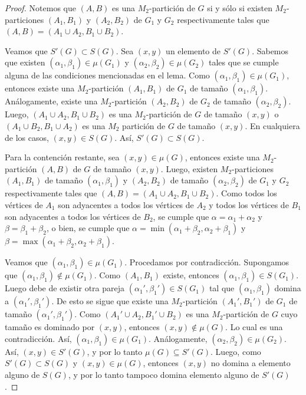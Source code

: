 \begin{proof}
Notemos que $(A,B)$ es una $M_2$-partición de $G$ si y sólo si existen $M_2$-particiones $(A_1,B_1)$ y $(A_2,B_2)$ de $G_1$ y $G_2$ respectivamente tales que $(A,B)=(A_1\cup A_2, B_1 \cup B_2)$.

Veamos que $S'(G)\subset S(G)$. Sea $(x,y)$ un elemento de $S'(G)$. Sabemos que existen $(\alpha_1,\beta_1)\in \mu(G_1)$ y $(\alpha_2,\beta_2)\in \mu(G_2)$ tales que se cumple alguna de las condiciones mencionadas en el lema. Como $(\alpha_1,\beta_1)\in \mu(G_1)$, entonces existe una $M_2$-partición $(A_1,B_1)$ de $G_1$ de tamaño $(\alpha_1, \beta_1)$. Análogamente, existe una $M_2$-partición $(A_2,B_2)$ de $G_2$ de tamaño $(\alpha_2, \beta_2)$. Luego, $(A_1\cup A_2, B_1 \cup B_2)$ es una $M_2$-partición de $G$ de tamaño $(x,y)$ o $(A_1\cup B_2, B_1 \cup A_2)$ es una $M_2$ partición de $G$ de tamaño $(x,y)$. En cualquiera de los casos, $(x,y)\in S(G)$. Así, $S'(G)\subset S(G)$.

Para la contención restante, sea $(x,y)\in\mu(G)$, entonces existe una $M_2$-partición $(A,B)$ de $G$ de tamaño $(x,y)$. Luego, existen $M_2$-particiones $(A_1,B_1)$ de tamaño $(\alpha_1, \beta_1)$ y $(A_2,B_2)$ de tamaño $(\alpha_2, \beta_2)$ de $G_1$ y $G_2$ respectivamente tales que $(A,B)=(A_1\cup A_2, B_1 \cup B_2)$. Como todos los vértices de $A_1$ son adyacentes a todos los vértices de $A_2$ y todos los vértices de $B_1$ son adyacentes a todos los vértices de $B_2$, se cumple que $\alpha = \alpha_1+\alpha_2$ y $\beta = \beta_1 + \beta_2$, o bien, se cumple que $\alpha = \min (\alpha_1+\beta_2, \alpha_2+\beta_1)$ y $\beta = \max (\alpha_1+\beta_2, \alpha_2+\beta_1)$.

Veamos que $(\alpha_1, \beta_1)\in\mu(G_1)$. Procedamos por contradicción. Supongamos que $(\alpha_1, \beta_1)\notin\mu(G_1)$. Como $(A_1,B_1)$ existe, entonces $(\alpha_1, \beta_1)\in S(G_1)$. Luego debe de existir otra pareja $(\alpha_1', \beta_1')\in S(G_1)$ tal que $(\alpha_1, \beta_1)$ domina a $(\alpha_1', \beta_1')$. De esto se sigue que existe una $M_2$-partición $(A_1',B_1')$ de $G_1$ de tamaño $(\alpha_1', \beta_1')$. Como $(A_1'\cup A_2, B_1'\cup B_2)$ es una $M_2$-partición de $G$ cuyo tamaño es dominado por $(x,y)$, entonces $(x,y)\notin\mu(G)$. Lo cual es una contradicción. Así, $(\alpha_1, \beta_1)\in\mu(G_1)$. Análogamente, $(\alpha_2, \beta_2)\in\mu(G_2)$. Así, $(x,y)\in S'(G)$, y por lo tanto $\mu(G)\subseteq S'(G)$. Luego, como $S'(G)\subset S(G)$ y $(x,y)\in\mu(G)$, entonces $(x,y)$ no domina a elemento alguno de $S(G)$, y por lo tanto tampoco domina elemento alguno de $S'(G)$.


\end{proof}
